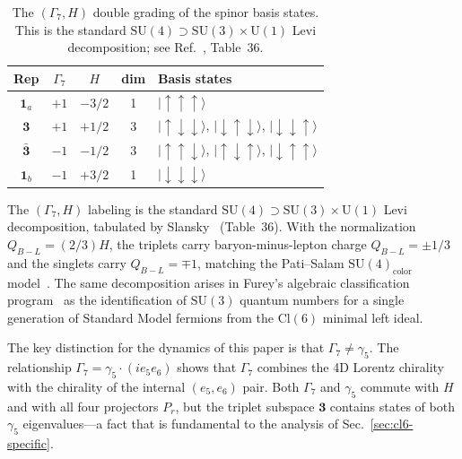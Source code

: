\documentclass[12pt]{article}
\theoremstyle{definition}
\theoremstyle{remark}
\newcommand{\cl}{\mathrm{Cl}}           %
\newcommand{\su}{\mathrm{SU}}           %
\newcommand{\GaSeven}{\Gamma_7}                      %
\begin{document}
	\begin{table}[ht]
		\centering
		\caption{The $(\GaSeven, H)$ double grading of the spinor basis states.
			This is the standard $\su(4)\supset\su(3)\times\mathrm{U}(1)$ Levi
			decomposition; see Ref.~\cite{Slansky1981}, Table~36.}
		\label{tab:double-grading}
		\begin{tabular}{@{}ccccp{4.5cm}@{}}
			\toprule
			\textbf{Rep} & $\GaSeven$ & $H$ & \textbf{dim} & \textbf{Basis states} \\
			\midrule
			$\mathbf{1}_a$ & $+1$ & $-3/2$ & 1
			& $|\!\uparrow\uparrow\uparrow\rangle$ \\[3pt]
			$\mathbf{3}$ & $+1$ & $+1/2$ & 3
			& $|\!\uparrow\downarrow\downarrow\rangle$,\;
			$|\!\downarrow\uparrow\downarrow\rangle$,\;
			$|\!\downarrow\downarrow\uparrow\rangle$ \\[3pt]
			$\bar{\mathbf{3}}$ & $-1$ & $-1/2$ & 3
			& $|\!\uparrow\uparrow\downarrow\rangle$,\;
			$|\!\uparrow\downarrow\uparrow\rangle$,\;
			$|\!\downarrow\uparrow\uparrow\rangle$ \\[3pt]
			$\mathbf{1}_b$ & $-1$ & $+3/2$ & 1
			& $|\!\downarrow\downarrow\downarrow\rangle$ \\
			\bottomrule
		\end{tabular}
	\end{table}
	
	The $(\GaSeven, H)$ labeling is the standard $\su(4)\supset\su(3)\times\mathrm{U}(1)$
	Levi decomposition, tabulated by Slansky~\cite{Slansky1981} (Table~36).
	With the normalization $Q_{B-L}=(2/3)H$, the triplets carry
	baryon-minus-lepton charge $Q_{B-L}=\pm1/3$ and the singlets carry
	$Q_{B-L}=\mp1$, matching the Pati--Salam $\su(4)_{\mathrm{color}}$
	model~\cite{PatiSalam1974}.  The same decomposition arises in Furey's
	algebraic classification
	program~\cite{Furey2012,Furey2014,Furey2015,Furey2018a,Furey2018b} as the
	identification of $\su(3)$ quantum numbers for a single generation of
	Standard Model fermions from the $\cl(6)$ minimal left ideal.
	
	The key distinction for the dynamics of this paper is that $\GaSeven\neq\gamma_5$.
	The relationship $\GaSeven = \gamma_5\cdot(ie_5 e_6)$ shows that $\GaSeven$
	combines the 4D Lorentz chirality with the chirality of the internal
	$(e_5,e_6)$ pair.  Both $\GaSeven$ and $\gamma_5$ commute with $H$ and with
	all four projectors $P_r$, but the triplet subspace $\mathbf{3}$ contains
	states of both $\gamma_5$ eigenvalues---a fact that is fundamental to the
	analysis of Sec.~\ref{sec:cl6-specific}.
	
\end{document}
